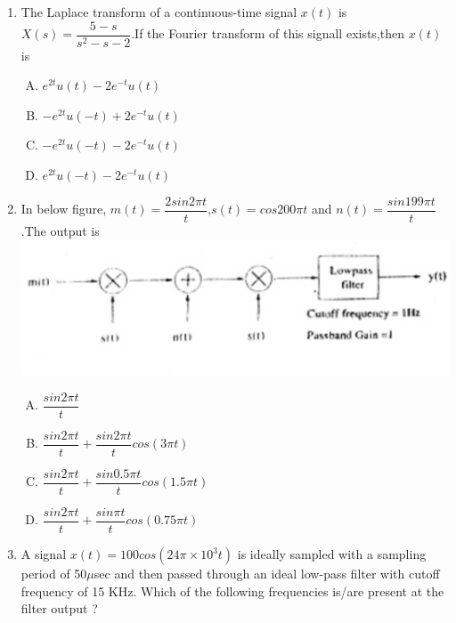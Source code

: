 \documentclass[journal,12pt,twocolumn]{IEEEtran}
\begin{document}
\begin{enumerate}[1.]
\begin{enumerate}[(A)]
\end{enumerate}

\item The Laplace transform of a continuous-time signal $x(t)$ is $X(s)=\dfrac{5-s}{s^{2}-s-2}$.If the Fourier transform of this signall exists,then $x(t)$ is
\begin{enumerate}[(A)]

\setlength\itemsep{1em}
\item $
e^{2t}u(t)-2e^{-t}u(t)
$
\item $
-e^{2t}u(-t)+2e^{-t}u(t)
$
\item $
-e^{2t}u(-t)-2e^{-t}u(t)
$
\item $
e^{2t}u(-t)-2e^{-t}u(t)
$


\end{enumerate}

\item In below figure, $m(t)=\dfrac{2sin 2\pi t}{t}$,$s(t)=cos200\pi t$ and $n(t)=\dfrac{sin199\pi t}{t}$.The output is \\
\includegraphics[scale=0.45]{fig20.eps}
\begin{enumerate}[(A)]
\setlength\itemsep{1em}
\item $
\dfrac{sin 2\pi t}{t}
$
\item $
\dfrac{sin 2\pi t}{t}+\dfrac{sin 2\pi t}{t}cos(3 \pi t)
$
\item $
\dfrac{sin 2\pi t}{t}+\dfrac{sin 0.5\pi t}{t}cos(1.5 \pi t)
$
\item $
\dfrac{sin 2\pi t}{t}+\dfrac{sin \pi t}{t}cos(0.75 \pi t)
$

\end{enumerate}

\item A signal $x(t)=100 cos(24 \pi \times 10^{3}t)$ is ideally sampled with a sampling period of 50$\mu$sec and then passed through an ideal low-pass filter with cutoff frequency of 15 KHz. Which of the following frequencies is/are present at the filter output ?

\begin{enumerate}[(A)]
\end{enumerate}
\end{enumerate}
\end{document}
